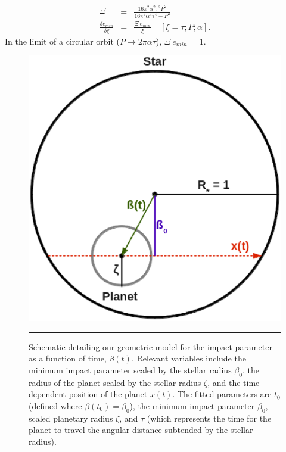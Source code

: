 \begin{eqnarray}
\Xi & \equiv & \frac{16 \pi^{2} \alpha^{2} \tau^{2} P^{2}}{16 \pi^{4} \alpha^{4} \tau^{4} - P^{4}} \\
\frac{\delta e_{min}}{\delta \xi} & = & \frac{\Xi~e_{min}}{\xi} ~~~~~ \left[\xi = \tau; P; \alpha \right].\nonumber
\label{eq-emin3}
\end{eqnarray}
In the limit of a circular orbit ($P \rightarrow 2 \pi \alpha \tau$),
$\Xi~e_{min}$ = 1.

\begin{figure}[t] 
  \begin{minipage}[c]{0.37\textwidth}
    \includegraphics[width=\textwidth]{figures/schem.eps}
  \end{minipage}\hfill
  \begin{minipage}[c]{0.6\textwidth}
    \caption{Schematic detailing our geometric model for the impact
      parameter as a function of time, $\beta(t)$.  Relevant variables
      include the minimum impact parameter scaled by the stellar radius
      $\beta_0$, the radius of the planet scaled by the stellar radius
      $\zeta$, and the time-dependent position of the planet $x(t)$.  The
      fitted parameters are $t_0$ (defined where $\beta(t_0) = \beta_0$),
      the minimum impact parameter $\beta_0$, scaled planetary radius
      $\zeta$, and $\tau$ (which represents the time for the planet to
      travel the angular distance subtended by the stellar radius). }
    \label{fig-schem}
    \hspace*{\fill}  
    \hrule
  \end{minipage}
\end{figure}

